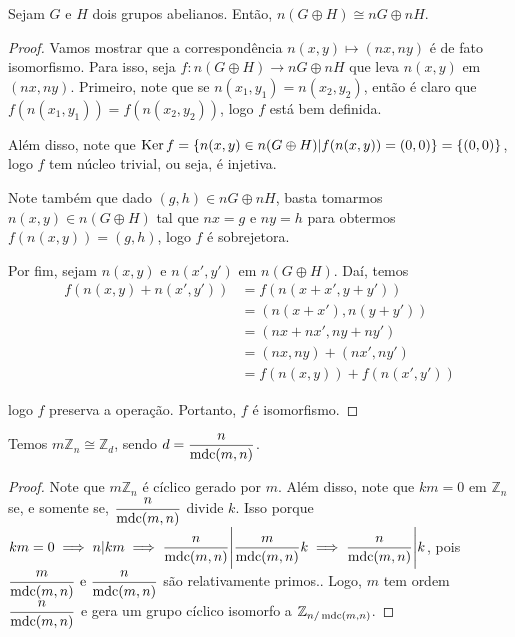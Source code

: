 	\begin{prop}
		\label{subgrupo abeliano nG}
		Sejam $G$ e $H$ dois grupos abelianos. Então, $n(G\oplus H)\cong nG\oplus nH$.
	\end{prop}
	\begin{proof}
		Vamos mostrar que a correspondência $n(x,y)\mapsto(nx,ny)$ é de fato isomorfismo. Para isso, seja $f: n(G\oplus H)\to nG\oplus nH$ que leva $n(x,y)$ em $(nx,ny)$. Primeiro, note que se $n(x_1,y_1) = n(x_2,y_2)$, então é claro que $f(n(x_1,y_1)) = f(n(x_2,y_2))$, logo $f$ está bem definida.
		\par\vspace{0.3cm} Além disso, note que $\operatorname{Ker} f = \left\{ n(x,y)\in n(G\oplus H)\vert f( n(x,y) ) = (0,0) \right\} = \left\{ (0,0) \right\}$, logo $f$ tem núcleo trivial, ou seja, é injetiva.
		\par\vspace{0.3cm} Note também que dado $(g,h)\in nG\oplus nH$, basta tomarmos $n(x,y)\in n(G\oplus H)$ tal que $nx = g$ e $ny = h$ para obtermos $f(n(x,y)) = (g,h)$, logo $f$ é sobrejetora.
		\par\vspace{0.3cm} Por fim, sejam $n(x,y)$ e $n(x',y')$ em $n(G\oplus H)$. Daí, temos
		\begin{align*}
		f( n(x,y) + n(x',y') ) &= f( n(x+x', y+y') ) \\ &= ( n(x+x'), n(y+y') ) \\ &= (nx + nx', ny + ny') \\ &= (nx, ny) + (nx', ny') \\ &= f(n(x,y)) + f(n(x',y'))
		\end{align*}
		\par\vspace{0.3cm} logo $f$ preserva a operação. Portanto, $f$ é isomorfismo.
	\end{proof}
	\begin{prop}
		\label{regra nG}
		Temos $m\mathbb{Z}_n\cong\mathbb{Z}_d$, sendo $\displaystyle{ d = \frac{n}{\operatorname{mdc}(m,n)} }$.
	\end{prop}
	\begin{proof}
		Note que $m\mathbb{Z}_n$ é cíclico gerado por $m$. Além disso, note que $km = 0$ em $\mathbb{Z}_n$ se, e somente se, $\displaystyle{\frac{n}{\operatorname{mdc}(m,n)}  }$ divide $k$. Isso porque $km = 0\implies n| km\implies \displaystyle{ \frac{n}{\operatorname{mdc}(m,n)}\Bigg| \frac{m}{\operatorname{mdc}(m,n)}k }\implies \displaystyle{ \frac{n}{\operatorname{mdc}(m,n)}\Bigg| k }$, pois $\displaystyle{ \frac{m}{\operatorname{mdc}(m,n)}\text{ e }\frac{n}{\operatorname{mdc}(m,n)}  }$ são relativamente primos.. Logo, $m$ tem ordem $\displaystyle{\frac{n}{\operatorname{mdc}(m,n)}}$ e gera um grupo cíclico isomorfo a $\mathbb{Z}_{n/\operatorname{mdc}(m,n)}$.
	\end{proof}
